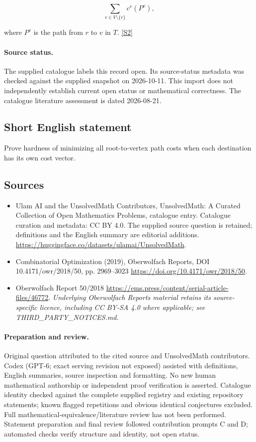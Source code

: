 \documentclass[11pt]{article}
\begin{document}
$$\sum_{v\in V\setminus\{r\}}c^v(P^v),$$

where $P^v$ is the path from $r$ to $v$ in $T$. \href{https://doi.org/10.4171/owr/2018/50}{[S2]}
\paragraph{Source status.}
The supplied catalogue labels this record open. Its source-status metadata was checked against the supplied snapshot on 2026-10-11. This import does not independently establish current open status or mathematical correctness. The catalogue literature assessment is dated 2026-08-21.
\subsection{Short English statement}
Prove hardness of minimizing all root-to-vertex path costs when each destination has its own cost vector.
\subsection{Sources}
\begin{itemize}
\item[S1] Ulam AI and the UnsolvedMath Contributors, UnsolvedMath: A Curated Collection of Open Mathematics Problems, catalogue entry. Catalogue curation and metadata: CC BY 4.0. The supplied source question is retained; definitions and the English summary are editorial additions.
\url{https://huggingface.co/datasets/ulamai/UnsolvedMath}.
\item[S2] Combinatorial Optimization (2019), Oberwolfach Reports, DOI 10.4171/owr/2018/50, pp. 2969--3023
\url{https://doi.org/10.4171/owr/2018/50}.
\item[S3] Oberwolfach Report 50/2018
\url{https://ems.press/content/serial-article-files/46772}.
\textit{Underlying Oberwolfach Reports material retains its source-specific licence, including CC BY-SA 4.0 where applicable; see THIRD\_PARTY\_NOTICES.md.}
\end{itemize}
\paragraph{Preparation and review.}
Original question attributed to the cited source and UnsolvedMath contributors. Codex (GPT-6; exact serving revision not exposed) assisted with definitions, English summaries, source inspection and formatting. No new human mathematical authorship or independent proof verification is asserted. Catalogue identity checked against the complete supplied registry and existing repository statements; known flagged repetitions and obvious identical conjectures excluded. Full mathematical-equivalence/literature review has not been performed. Statement preparation and final review followed contribution prompts C and D; automated checks verify structure and identity, not open status.
\label{end:statement}
\end{document}
